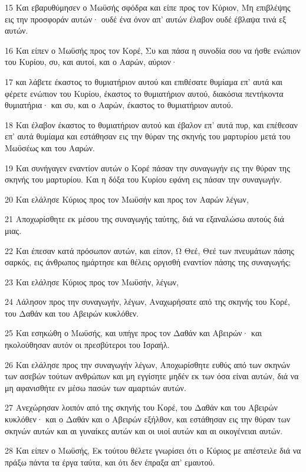 \par 15 Και εβαρυθύμησεν ο Μωϋσής σφόδρα και είπε προς τον Κύριον, Μη επιβλέψης εις την προσφοράν αυτών· ουδέ ένα όνον απ' αυτών έλαβον ουδέ έβλαψα τινά εξ αυτών.
\par 16 Και είπεν ο Μωϋσής προς τον Κορέ, Συ και πάσα η συνοδία σου να ήσθε ενώπιον του Κυρίου, συ, και αυτοί, και ο Ααρών, αύριον·
\par 17 και λάβετε έκαστος το θυμιατήριον αυτού και επιθέσατε θυμίαμα επ' αυτά και φέρετε ενώπιον του Κυρίου, έκαστος το θυμιατήριον αυτού, διακόσια πεντήκοντα θυμιατήρια· και συ, και ο Ααρών, έκαστος το θυμιατήριον αυτού.
\par 18 Και έλαβον έκαστος το θυμιατήριον αυτού και έβαλον επ' αυτά πυρ, και επέθεσαν επ' αυτά θυμίαμα και εστάθησαν εις την θύραν της σκηνής του μαρτυρίου μετά του Μωϋσέως και του Ααρών.
\par 19 Και συνήγαγεν εναντίον αυτών ο Κορέ πάσαν την συναγωγήν εις την θύραν της σκηνής του μαρτυρίου. Και η δόξα του Κυρίου εφάνη εις πάσαν την συναγωγήν.
\par 20 Και ελάλησε Κύριος προς τον Μωϋσήν και προς τον Ααρών λέγων,
\par 21 Αποχωρίσθητε εκ μέσου της συναγωγής ταύτης, διά να εξαναλώσω αυτούς διά μιας.
\par 22 Και έπεσαν κατά πρόσωπον αυτών, και είπον, Ω Θεέ, Θεέ των πνευμάτων πάσης σαρκός, εις άνθρωπος ημάρτησε και θέλεις οργισθή εναντίον πάσης της συναγωγής;
\par 23 Και ελάλησε Κύριος προς τον Μωϋσήν, λέγων,
\par 24 Λάλησον προς την συναγωγήν, λέγων, Αναχωρήσατε από της σκηνής του Κορέ, του Δαθάν και του Αβειρών κυκλόθεν.
\par 25 Και εσηκώθη ο Μωϋσής, και υπήγε προς τον Δαθάν και Αβειρών· και ηκολούθησαν αυτόν οι πρεσβύτεροι του Ισραήλ.
\par 26 Και ελάλησε προς την συναγωγήν λέγων, Αποχωρίσθητε ευθύς από των σκηνών των ασεβών τούτων ανθρώπων και μη εγγίσητε μηδέν εκ των όσα είναι αυτών, διά να μη αφανισθήτε εν μέσω πασών των αμαρτιών αυτών.
\par 27 Ανεχώρησαν λοιπόν από της σκηνής του Κορέ, του Δαθάν και του Αβειρών κυκλόθεν· και ο Δαθάν και ο Αβειρών εξήλθον, και εστάθησαν εις την θύραν των σκηνών αυτών και αι γυναίκες αυτών και οι υιοί αυτών και αι οικογένειαι αυτών.
\par 28 Και είπεν ο Μωϋσής, Εκ τούτου θέλετε γνωρίσει ότι ο Κύριος με απέστειλε διά να πράξω πάντα τα έργα ταύτα, και ότι δεν έπραξα απ' εμαυτού.
